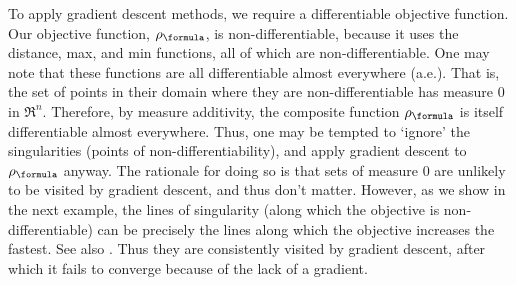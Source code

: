 To apply gradient descent methods, we require a differentiable objective function. 
Our objective function, $\robf$, is non-differentiable, because it uses the distance, max, and min functions, all of which are non-differentiable.
One may note that these functions are all differentiable almost everywhere (a.e.).
That is, the set of points in their domain where they are non-differentiable has measure 0 in $\Re^n$. 
Therefore, by measure additivity, the composite function $\robf$ is itself differentiable almost everywhere.
Thus, one may be tempted to `ignore' the singularities (points of non-differentiability), and apply gradient descent to $\robf$ anyway.
The rationale for doing so is that sets of measure 0 are unlikely to be visited by gradient descent, and thus don't matter. 
However, as we show in the next example, the lines of singularity (along which the objective is non-differentiable) can be  precisely the lines along which the objective increases the fastest.
See also \cite{Cortes08_Discontinuous}.
Thus they are consistently visited by gradient descent, after which it fails to converge because of the lack of a gradient.


